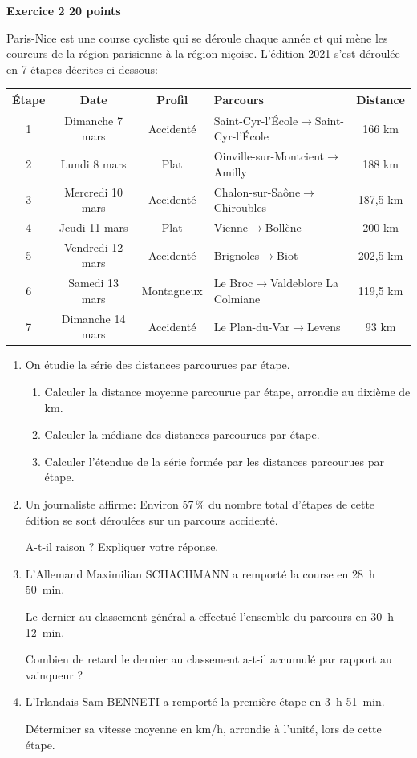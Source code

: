 \documentclass[11pt]{article}
\begin{document}
\medskip

\textbf{Exercice 2 \hfill 20 points}

\medskip

Paris-Nice est une course cycliste qui se déroule chaque année et qui mène les coureurs de la région parisienne à la région niçoise. L'édition 2021 s'est déroulée en 7 étapes décrites ci-dessous:

\begin{center}
\begin{tabularx}{\linewidth}{|c|c|c|>{\small}X|c|}\hline
\textbf{Étape} &\textbf{Date}&\textbf{Profil}&\textbf{Parcours}&\textbf{Distance}
\\ \hline
1&Dimanche 7 mars&Accidenté&\footnotesize Saint-Cyr-l'École$\to$Saint-Cyr-l'École&166 km\\ \hline
2&Lundi 8 mars&Plat&Oinville-sur-Montcient$\to$Amilly&188 km\\ \hline
3&Mercredi 10 mars&Accidenté& Chalon-sur-Saône$\to$Chiroubles&187,5 km\\ \hline
4&Jeudi 11 mars &Plat&Vienne$\to$Bollène&200 km\\ \hline
5&Vendredi 12 mars&Accidenté&Brignoles$\to$Biot&202,5 km\\ \hline
6&Samedi 13 mars&Montagneux&Le Broc$\to$Valdeblore La Colmiane&119,5 km\\ \hline
7&Dimanche 14 mars&Accidenté& Le Plan-du-Var$\to$Levens&93 km\\ \hline
\end{tabularx}
\end{center}

\begin{enumerate}
\item On étudie la série des distances parcourues par étape.
	\begin{enumerate}
		\item Calculer la distance moyenne parcourue par étape, arrondie au dixième de km.
		\item Calculer la médiane des distances parcourues par étape.
		\item Calculer l'étendue de la série formée par les distances parcourues par étape.
	\end{enumerate}	
\item Un journaliste affirme: \og Environ 57\,\% du nombre total d'étapes de cette édition se sont déroulées sur un parcours accidenté. \fg{} 

A-t-il raison ? Expliquer votre réponse.
\item L'Allemand Maximilian SCHACHMANN a remporté la course en 28~h 50~min.

Le dernier au classement général a effectué l'ensemble du parcours en 30~h 12~min.

Combien de retard le dernier au classement a-t-il accumulé par rapport au vainqueur ?
\item L'Irlandais Sam BENNETI a remporté la première étape en 3~h 51~min. 

Déterminer sa vitesse moyenne en km/h, arrondie à l'unité, lors de cette étape.
\end{enumerate}
\end{document}
